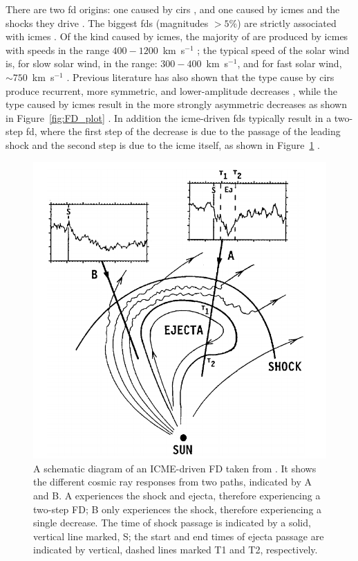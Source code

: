 There are two \gls{fd} origins: one caused by \glspl{cir} \citep{dumbovic_forbush_2016}, and one caused by \glspl{icme} and the shocks they drive \citep{belov_forbush_2008}. The biggest \glspl{fd} (magnitudes $> 5\%$) are strictly associated with \glspl{icme} \citep{belov_what_2001}. Of the kind caused by \glspl{icme}, the majority of are produced by \glspl{icme} with speeds in the range $400 - 1200$~km~s$^{-1}$ \citep{lingri_forbush_2016}; the typical speed of the solar wind is, for slow solar wind, in the range: $300 - 400$~km~s$^{-1}$, and for fast solar wind, $\sim 750$~km~s$^{-1}$ \citep{owens_heliospheric_2013}. Previous literature has also shown that the type cause by \glspl{cir} produce recurrent, more symmetric, and lower-amplitude decreases \citep{dumbovic_cosmic_2012}, while the type caused by \glspl{icme} result in the more strongly asymmetric decreases as shown in Figure~\ref{fig:FD_plot} \citep{lockwood_forbush_1971, cane_coronal_2000, dumbovic_cosmic_2012}. In addition the \gls{icme}-driven \glspl{fd} typically result in a two-step \gls{fd}, where the first step of the decrease is due to the passage of the leading shock and the second step is due to the \gls{icme} itself, as shown in Figure~\ref{fig:FD_CME} \citep{cane_coronal_2000}.

\begin{figure}[ht!]
	\centering
	\includegraphics[width=0.75\columnwidth]{FD_CME.png}
	\caption{A schematic diagram of an ICME-driven FD taken from \citet{cane_coronal_2000}. It shows the different cosmic ray responses from two paths, indicated by A and B. A experiences the shock and ejecta, therefore experiencing a two-step FD; B only experiences the shock, therefore experiencing a single decrease. The time of shock passage is indicated by a solid, vertical line marked, S; the start and end times of ejecta passage are indicated by vertical, dashed lines marked T1 and T2, respectively.}
	\label{fig:FD_CME}
\end{figure}

